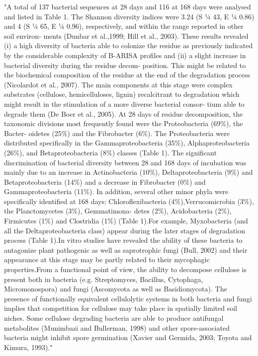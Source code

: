 "A total of 137 bacterial sequences at 28 days and 116 at 168 days were analysed and listed in Table 1. The Shannon diversity indices were 3.24 (S 1⁄4 43, E 1⁄4 0.86) and 4 (S 1⁄4 65, E 1⁄4 0.96), respectively, and within the range reported in other soil environ- ments (Dunbar et al.,1999; Hill et al., 2003). These results revealed (i) a high diversity of bacteria able to colonize the residue as previously indicated by the considerable complexity of B-ARISA profiles and (ii) a slight increase in bacterial diversity during the residue decom- position. This might be related to the biochemical composition of the residue at the end of the degradation process (Nicolardot et al., 2007). The main components at this stage were complex substrates (cellulose, hemicelluloses, lignin) recalcitrant to degradation which might result in the stimulation of a more diverse bacterial consor- tium able to degrade them (De Boer et al., 2005).
At 28 days of residue decomposition, the taxonomic divisions most frequently found were the Proteobacteria (69\%), the Bacter- oidetes (25\%) and the Fibrobacter (6\%). The Proteobacteria were distributed specifically in the Gammaproteobacteria (35\%), Alphaproteobacteria (26\%), and Betaproteobacteria (8\%) classes (Table 1). The significant discrimination of bacterial diversity between 28 and 168 days of incubation was mainly due to an increase in Actinobacteria (10\%), Deltaproteobacteria (9\%) and Betaproteobacteria (14\%) and a decrease in Fibrobacter (0\%) and Gammaproteobacteria (11\%). In addition, several other minor phyla were specifically identified at 168 days: Chloroflexibacteria (4\%),Verrucomicrobia (3\%), the Planctomycetes (3\%), Gemmatimona- detes (2\%), Acidobacteria (2\%), Firmicutes (1\%) and Clostridia (1\%) (Table 1).For example, Myxobacteria (and all the Deltaproteobacteria class) appear during the later stages of degradation process (Table 1).In vitro studies have revealed the ability of these bacteria to antagonize plant pathogenic as well as saprotrophic fungi (Bull, 2002) and their appearance at this stage may be partly related to their mycophagic properties.From a functional point of view, the ability to decompose cellulose is present both in bacteria (e.g. Streptomyces, Bacillus, Cytophaga, Micromonospora) and fungi (Ascomycota as well as Basidiomycota). The presence of functionally equivalent cellulolytic systems in both bacteria and fungi implies that competition for cellulose may take place in spatially limited soil niches. Some cellulose degrading bacteria are able to produce antifungal metabolites (Munimbazi and Bullerman, 1998) and other spore-associated bacteria might inhibit spore germination (Xavier and Germida, 2003; Toyota and Kimura, 1993)." \cite{Bastian_2009}

